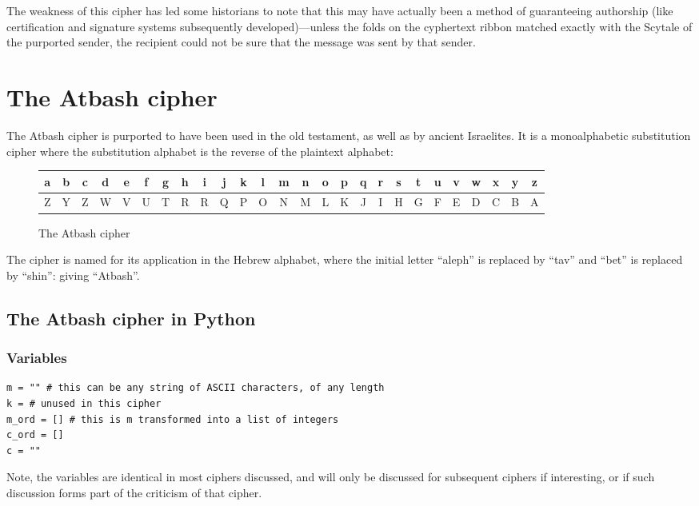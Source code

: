 \documentclass{AIAA}
\begin{document}
The weakness of this cipher has led some historians to note that this may have actually been a method of guaranteeing authorship (like certification and signature systems subsequently developed)---unless the folds on the cyphertext ribbon matched exactly with the Scytale of the purported sender, the recipient could not be sure that the message was sent by that sender.

\section{The Atbash cipher}
The Atbash cipher is purported to have been used in the old testament, as well as by ancient Israelites. It is a monoalphabetic substitution cipher where the substitution alphabet is the reverse of the plaintext alphabet:

\begin{figure}[h!]
\begin{tabular}{|c|c|c|c|c|c|c|c|c|c|c|c|c|c|c|c|c|c|c|c|c|c|c|c|c|c|}
\hline
a & b & c & d & e & f & g & h & i & j & k & l & m & n & o & p & q & r & s & t & u & v & w & x & y & z \\ \hline
Z & Y & Z & W & V & U & T & R & R & Q & P & O & N & M & L & K & J & I & H & G & F & E & D & C & B & A \\
\hline
\end{tabular}
\caption{The Atbash cipher}
\end{figure}

The cipher is named for its application in the Hebrew alphabet, where the initial letter ``aleph'' is replaced by ``tav'' and ``bet'' is replaced by ``shin'': giving ``Atbash''. 

\subsection{The Atbash cipher in Python}

\subsubsection{Variables}
\begin{verbatim}
m = "" # this can be any string of ASCII characters, of any length
k = # unused in this cipher
m_ord = [] # this is m transformed into a list of integers
c_ord = []
c = ""
\end{verbatim}
Note, the variables are identical in most ciphers discussed, and will only be discussed for subsequent ciphers if interesting, or if such discussion forms part of the criticism of that cipher.
\end{document}
